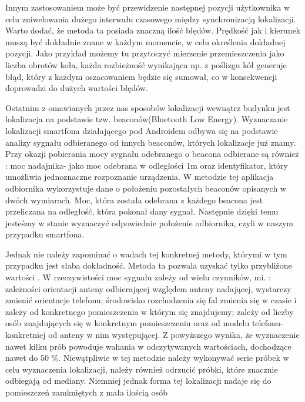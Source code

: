 \documentclass[11pt]{article}
\begin{document}
		Innym zastosowaniem może być przewidzenie następnej pozycji użytkownika w celu zniwelowania dużego interwału czasowego między synchronizacją lokalizacji. Warto dodać, że metoda ta posiada znaczną ilość błędów. Prędkość jak i kierunek muszą być dokładnie znane w każdym momencie, w celu określenia dokładnej pozycji. Jako przykład możemy tu przytoczyć mierzenie przemieszczenia jako liczba obrotów koła, każda rozbieżność wynikająca np. z poślizgu kół generuje błąd, który z każdym oszacowaniem będzie się sumował, co w konsekwencji doprowadzi do dużych wartości błędów.
		
		Ostatnim z omawianych przez nas sposobów lokalizacji wewnątrz budynku jest lokalizacja na podstawie tzw. beaconów(Bluetooth Low Energy). Wyznaczanie lokalizacji smartfona działającego pod Androidem odbywa się na podstawie analizy sygnału odbieranego od innych beaconów, których lokalizacje już znamy. Przy okazji pobierania mocy sygnału odebranego o beacona odbierane są również : moc nadajnika- jako moc odebrana w odległości 1m oraz identyfikator, który umożliwia jednoznaczne rozpoznanie urządzenia.
		W metodzie tej aplikacja odbiornika wykorzystuje dane o położeniu pozostałych beaconów opisanych w dwóch wymiarach. Moc, która została odebrana z każdego beacona jest przeliczana na odległość, która pokonał dany sygnał. Następnie dzięki temu jesteśmy w stanie wyznaczyć odpowiednie położenie odbiornika, czyli w naszym przypadku smartfona.
		
		Jednak nie należy zapominać o wadach tej konkretnej metody, którymi w tym przypadku jest słaba \mbox{dokładność.} 
		Metoda ta pozwala uzyskać tylko przybliżone wartości . W rzeczywistości moc sygnału zależy od wielu czynników, mi. : zależności orientacji anteny odbierającej względem anteny nadającej, wystarczy zmienić orientacje telefonu; środowisko rozchodzenia się fal zmienia się w czasie i zależy od konkretnego pomieszczenia w którym się znajdujemy; zależy od liczby osób znajdujących się w konkretnym pomieszczeniu oraz od modelu telefonu- konkretniej od anteny w nim występującej.
		Z powyższego wynika, że wyznaczenie nawet kilku prób powoduje wahania w odczytywanych wartościach, dochodzące nawet do 50 \%. Niewątpliwie w tej metodzie należy wykonywać serie próbek w celu wyznaczenia lokalizacji, należy również odrzucić próbki, które znacznie odbiegają od mediany. Niemniej jednak forma tej lokalizacji nadaje się do pomieszczeń zamkniętych z mała ilością osób
		
		
		
\end{document}
